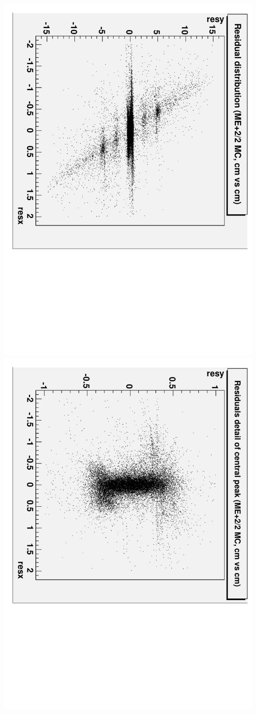 \documentclass[compress]{beamer}
\begin{document}
\begin{frame}
\vfill
\begin{columns}
\includegraphics[height=\linewidth, angle=90]{MC_residuals.pdf}
\includegraphics[height=\linewidth, angle=90]{MC_residuals_detail.pdf}
\end{columns}
\end{frame}
\end{document}
